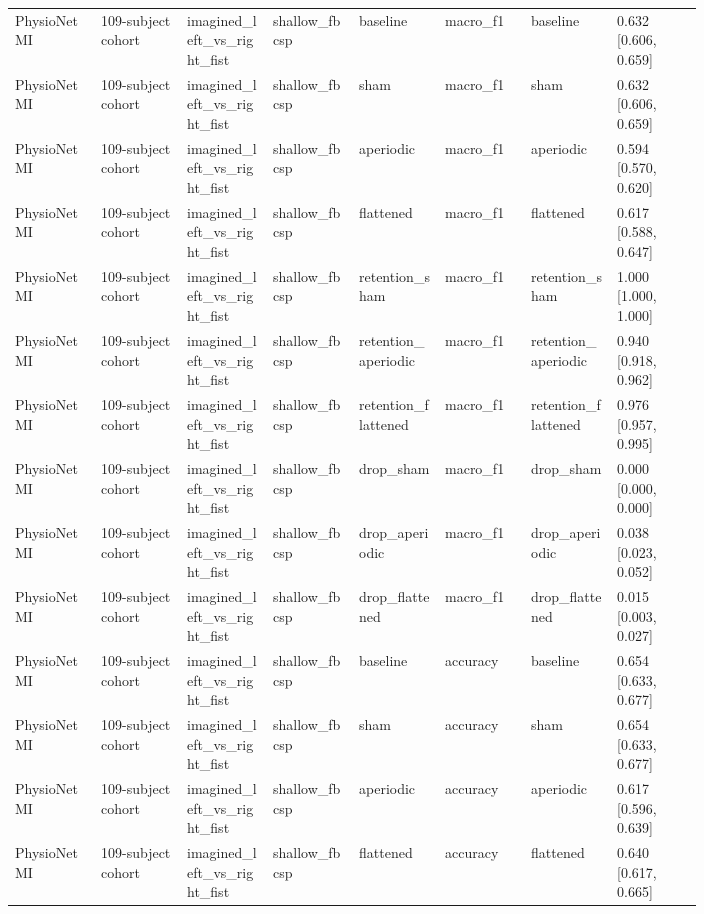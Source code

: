 \begin{longtable}{p{0.10\linewidth}p{0.10\linewidth}p{0.10\linewidth}p{0.10\linewidth}p{0.10\linewidth}p{0.10\linewidth}p{0.10\linewidth}p{0.10\linewidth}}
PhysioNet MI & 109-subject cohort & imagined\_left\_vs\_right\_fist & shallow\_fbcsp & baseline & macro\_f1 & baseline & 0.632 [0.606, 0.659]\\
PhysioNet MI & 109-subject cohort & imagined\_left\_vs\_right\_fist & shallow\_fbcsp & sham & macro\_f1 & sham & 0.632 [0.606, 0.659]\\
PhysioNet MI & 109-subject cohort & imagined\_left\_vs\_right\_fist & shallow\_fbcsp & aperiodic & macro\_f1 & aperiodic & 0.594 [0.570, 0.620]\\
PhysioNet MI & 109-subject cohort & imagined\_left\_vs\_right\_fist & shallow\_fbcsp & flattened & macro\_f1 & flattened & 0.617 [0.588, 0.647]\\
PhysioNet MI & 109-subject cohort & imagined\_left\_vs\_right\_fist & shallow\_fbcsp & retention\_sham & macro\_f1 & retention\_sham & 1.000 [1.000, 1.000]\\
PhysioNet MI & 109-subject cohort & imagined\_left\_vs\_right\_fist & shallow\_fbcsp & retention\_aperiodic & macro\_f1 & retention\_aperiodic & 0.940 [0.918, 0.962]\\
PhysioNet MI & 109-subject cohort & imagined\_left\_vs\_right\_fist & shallow\_fbcsp & retention\_flattened & macro\_f1 & retention\_flattened & 0.976 [0.957, 0.995]\\
PhysioNet MI & 109-subject cohort & imagined\_left\_vs\_right\_fist & shallow\_fbcsp & drop\_sham & macro\_f1 & drop\_sham & 0.000 [0.000, 0.000]\\
PhysioNet MI & 109-subject cohort & imagined\_left\_vs\_right\_fist & shallow\_fbcsp & drop\_aperiodic & macro\_f1 & drop\_aperiodic & 0.038 [0.023, 0.052]\\
PhysioNet MI & 109-subject cohort & imagined\_left\_vs\_right\_fist & shallow\_fbcsp & drop\_flattened & macro\_f1 & drop\_flattened & 0.015 [0.003, 0.027]\\
PhysioNet MI & 109-subject cohort & imagined\_left\_vs\_right\_fist & shallow\_fbcsp & baseline & accuracy & baseline & 0.654 [0.633, 0.677]\\
PhysioNet MI & 109-subject cohort & imagined\_left\_vs\_right\_fist & shallow\_fbcsp & sham & accuracy & sham & 0.654 [0.633, 0.677]\\
PhysioNet MI & 109-subject cohort & imagined\_left\_vs\_right\_fist & shallow\_fbcsp & aperiodic & accuracy & aperiodic & 0.617 [0.596, 0.639]\\
PhysioNet MI & 109-subject cohort & imagined\_left\_vs\_right\_fist & shallow\_fbcsp & flattened & accuracy & flattened & 0.640 [0.617, 0.665]\\

\end{longtable}
